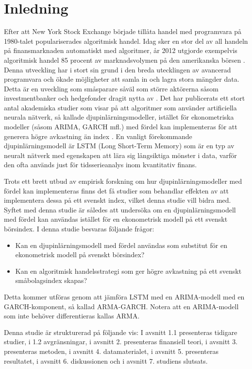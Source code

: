 \documentclass[11pt]{article}
\numberwithin{equation}{section}
\numberwithin{table}{section}
\numberwithin{figure}{section}
\begin{document}
\section{Inledning}
Efter att New York Stock Exchange började tillåta handel med programvara på 1980-talet populariserades algoritmisk handel.  Idag sker en stor del av all handeln på finansmarknaden automatiskt med algoritmer, år 2012 utgjorde exempelvis algoritmisk handel 85 procent av marknadsvolymen på den amerikanska börsen \parencite[][,s.258]{glantz2013multi}. Denna utveckling har i stort sin grund i den breda utecklingen av avancerad programvara och ökade möjligheter att samla in och lagra stora mängder data. Detta är en uveckling som småsparare såväl som större aktörerna såsom investmentbanker och hedgefonder dragit nytta av \parencite{DE_Shaw}. Det har publicerats ett stort antal akademiska studier som visar på att algoritmer som använder artificiella neurala nätverk, så kallade djupinlärningsmodeller, istället för ekonometriska modeller (såsom ARIMA, GARCH mfl.) med fördel kan implementeras för att generera högre avkastning än index \parencite{paliwal2009neural}. En vanligt förekommande djupinlärningsmodell är LSTM (Long Short-Term Memory) som är en typ av neuralt nätverk med egenskapen att lära sig långsiktiga mönster i data, varför den ofta används just för tidsserieanalys inom kvantitativ finans.

Trots ett brett utbud av empirisk forskning om hur djupinlärningsmodeller med fördel kan implementeras finns det få studier som behandlar effekten av att implementera dessa på ett svenskt index, vilket denna studie vill bidra med. Syftet med denna studie är således att undersöka om en djupinlärningsmodell med fördel kan användas istället för en ekonometrisk modell på ett svenskt börsindex. I denna studie besvaras följande frågor:

\begin{itemize}
    \item Kan en djupinlärningsmodell med fördel användas som substitut för en  ekonometrisk modell på svenskt börsindex?
    \item Kan en algoritmisk handelsstrategi som ger högre avkastning på ett svenskt småbolagsindex skapas?
\end{itemize}

Detta kommer utföras genom att jämföra LSTM med en ARIMA-modell med en GARCH-komponent, så kallad ARMA-GARCH. Notera att en ARIMA-modell som inte behöver differentieras kallas ARMA.

Denna studie är strukturerad på följande vis: I avsnitt 1.1 presenteras tidigare studier, i 1.2 avgränsningar, i avsnitt 2. presenteras finansiell teori, i avsnitt 3. presenteras metoden, i avsnitt 4. datamaterialet, i avsnitt 5. presenteras resultatet, i avsnitt 6. diskussionen och i avsnitt 7. studiens slutsats.
\end{document}
